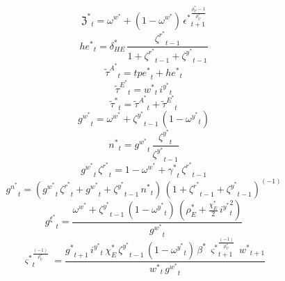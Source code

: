 \begin{dmath}
{{\mathfrak{Z}^*}}_{t}={{\omega^w^*}}+\left(1-{{\omega^w^*}}\right)\, {{\epsilon^*}}_{t+1}^{\frac{{{\rho_U^*}}-1}{{{\rho_U^*}}}}
\end{dmath}
\begin{dmath}
{{he^*}}_{t}={{\delta_{HE}^*}}\, \frac{{{\zeta^r^*}}_{t-1}}{1+{{\zeta^r^*}}_{t-1}+{{\zeta^y^*}}_{t-1}}
\end{dmath}
\begin{dmath}
{\tilde{\tau}^A^*}_{t}={{tpe^*}}_{t}+{{he^*}}_{t}
\end{dmath}
\begin{dmath}
{\tilde{\tau}^E^*}_{t}={{w^*}}_{t}\, {{i^y^*}}_{t}
\end{dmath}
\begin{dmath}
{\tilde{\tau}^*}_{t}={\tilde{\tau}^A^*}_{t}+{\tilde{\tau}^E^*}_{t}
\end{dmath}
\begin{dmath}
{{g^w^*}}_{t}={{\omega^w^*}}+{{\zeta^y^*}}_{t-1}\, \left(1-{{\omega^y^*}}_{t}\right)
\end{dmath}
\begin{dmath}
{{n^*}}_{t}={{g^w^*}}_{t}\, \frac{{{\zeta^y^*}}_{t}}{{{\zeta^y^*}}_{t-1}}
\end{dmath}
\begin{dmath}
{{g^w^*}}_{t}\, {{\zeta^r^*}}_{t}=1-{{\omega^w^*}}+{{\gamma^*}}_{t}\, {{\zeta^r^*}}_{t-1}
\end{dmath}
\begin{dmath}
{{g^n^*}}_{t}=\left({{g^w^*}}_{t}\, {{\zeta^r^*}}_{t}+{{g^w^*}}_{t}+{{\zeta^y^*}}_{t-1}\, {{n^*}}_{t}\right)\, \left(1+{{\zeta^r^*}}_{t-1}+{{\zeta^y^*}}_{t-1}\right)^{\left(-1\right)}
\end{dmath}
\begin{dmath}
{{g^{\xi}^*}}_{t}=\frac{{{\omega^w^*}}+{{\zeta^y^*}}_{t-1}\, \left(1-{{\omega^y^*}}_{t}\right)\, \left({{\rho_E^*}}+\frac{{{\chi_E^*}}}{2}\, {{i^y^*}}_{t}^{2}\right)}{{{g^w^*}}_{t}}
\end{dmath}
\begin{dmath}
{{\varsigma^*}}_{t}^{\frac{\left(-1\right)}{{{\rho_U^*}}}}=\frac{{{g^*}}_{t+1}\, {{i^y^*}}_{t}\, {{\chi_E^*}}\, {{\zeta^y^*}}_{t-1}\, \left(1-{{\omega^y^*}}_{t}\right)\, {{\beta^*}}\, {{\varsigma^*}}_{t+1}^{\frac{\left(-1\right)}{{{\rho_U^*}}}}\, {{w^*}}_{t+1}}{{{w^*}}_{t}\, {{g^w^*}}_{t}}
\end{dmath}
